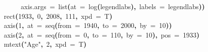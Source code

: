 \documentclass[a4paper]{article}
\newcommand{\hlnumber}[1]{\textcolor[rgb]{0.0823529411764706,0.0784313725490196,0.709803921568627}{#1}}%
\newcommand{\hlfunctioncall}[1]{\textcolor[rgb]{1,0,0}{#1}}%
\newcommand{\hlstring}[1]{\textcolor[rgb]{0.6,0.6,1}{#1}}%
\newcommand{\hlkeyword}[1]{\textcolor[rgb]{0,0,0}{\textbf{#1}}}%
\newcommand{\hlargument}[1]{\textcolor[rgb]{0.694117647058824,0.247058823529412,0.0196078431372549}{#1}}%
\newcommand{\hlsymbol}[1]{\textcolor[rgb]{0,0,0}{#1}}%
\newcommand{\hlprompt}[1]{\textcolor[rgb]{0,0,0}{#1}}%
\newcommand{\hlstd}[1]{\textcolor[rgb]{0,0,0}{#1}}%
\newenvironment{Houtput}{\raggedright}{%
%
}
\begin{document}
\begin{Houtput}
\hlstd{}\hlprompt{{\ }}{\ }{\ }{\ }{\ }\hlargument{axis.args}{\ }\hlargument{=}{\ }\hlfunctioncall{list}\hlkeyword{(}\hlargument{at}{\ }\hlargument{=}{\ }\hlfunctioncall{log}\hlkeyword{(}\hlsymbol{legendlabs}\hlkeyword{)}\hlkeyword{,}{\ }\hlargument{labels}{\ }\hlargument{=}{\ }\hlsymbol{legendlabs}\hlkeyword{)}\hlkeyword{)}\mbox{}
\normalfont
\hspace*{\fill}\\
\hlstd{}\ttfamily\noindent
\hlprompt{\usebox{\hlnormalsizeboxgreaterthan}{\ }}\hlfunctioncall{rect}\hlkeyword{(}\hlnumber{1933}\hlkeyword{,}{\ }\hlnumber{0}\hlkeyword{,}{\ }\hlnumber{2008}\hlkeyword{,}{\ }\hlnumber{111}\hlkeyword{,}{\ }\hlargument{xpd}{\ }\hlargument{=}{\ }\hlsymbol{T}\hlkeyword{)}\mbox{}
\normalfont
\hspace*{\fill}\\
\hlstd{}\ttfamily\noindent
\hlprompt{\usebox{\hlnormalsizeboxgreaterthan}{\ }}\hlfunctioncall{axis}\hlkeyword{(}\hlnumber{1}\hlkeyword{,}{\ }\hlargument{at}{\ }\hlargument{=}{\ }\hlfunctioncall{seq}\hlkeyword{(}\hlargument{from}{\ }\hlargument{=}{\ }\hlnumber{1940}\hlkeyword{,}{\ }\hlargument{to}{\ }\hlargument{=}{\ }\hlnumber{2000}\hlkeyword{,}{\ }\hlargument{by}{\ }\hlargument{=}{\ }\hlnumber{10}\hlkeyword{)}\hlkeyword{)}\mbox{}
\normalfont
\hspace*{\fill}\\
\hlstd{}\ttfamily\noindent
\hlprompt{\usebox{\hlnormalsizeboxgreaterthan}{\ }}\hlfunctioncall{axis}\hlkeyword{(}\hlnumber{2}\hlkeyword{,}{\ }\hlargument{at}{\ }\hlargument{=}{\ }\hlfunctioncall{seq}\hlkeyword{(}\hlargument{from}{\ }\hlargument{=}{\ }\hlnumber{0}\hlkeyword{,}{\ }\hlargument{to}{\ }\hlargument{=}{\ }\hlnumber{110}\hlkeyword{,}{\ }\hlargument{by}{\ }\hlargument{=}{\ }\hlnumber{10}\hlkeyword{)}\hlkeyword{,}{\ }\hlargument{pos}{\ }\hlargument{=}{\ }\hlnumber{1933}\hlkeyword{)}\mbox{}
\normalfont
\hspace*{\fill}\\
\hlstd{}\ttfamily\noindent
\hlprompt{\usebox{\hlnormalsizeboxgreaterthan}{\ }}\hlfunctioncall{mtext}\hlkeyword{(}\hlstring{"Age"}\hlkeyword{,}{\ }\hlnumber{2}\hlkeyword{,}{\ }\hlargument{xpd}{\ }\hlargument{=}{\ }\hlsymbol{T}\hlkeyword{)}\mbox{}
\normalfont
\hspace*{\fill}\\
\hlstd{}
\end{Houtput}
\end{document}
